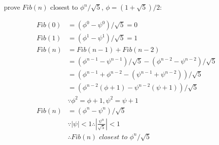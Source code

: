 \documentclass{article}
\begin{document}
prove $Fib(n)$ closest to $\phi^n/\sqrt{5}$, $\phi=(1+\sqrt{5})/2$:

\begin{align*}
Fib(0) &= (\phi^0 - \psi^0)/\sqrt{5} = 0 \\
Fib(1) &= (\phi^1 - \psi^1)/\sqrt{5} = 1 \\
Fib(n) &= Fib(n-1) + Fib(n-2)\\
&= (\phi^{n-1}-\psi^{n-1})/\sqrt{5} - (\phi^{n-2}-\psi^{n-2})/\sqrt{5} \\
&= (\phi^{n-1}+\phi^{n-2}-(\psi^{n-1}+\psi^{n-2}))/\sqrt{5} \\
&= (\phi^{n-2}(\phi+1)-\psi^{n-2}(\psi+1))/\sqrt{5} \\
&\because \phi^2=\phi+1,\psi^2=\psi+1 \\
Fib(n)&= (\phi^n-\psi^n)/\sqrt{5} \\
&\because |\psi| < 1 \therefore |\frac{\psi^n}{\sqrt{5}}|<1 \\
&\therefore \textit{$Fib(n)$ closest to $\phi^n/\sqrt{5}$}
\end{align*}
\end{document}
